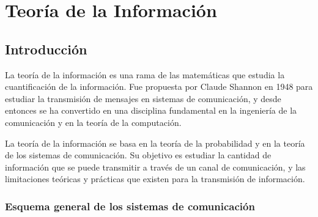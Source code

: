 \section{Teoría de la Información}\label{teoruxeda-de-la-informaciuxf3n}





\subsection{Introducción}\label{introducciuxf3n}

La teoría de la información es una rama de las matemáticas que estudia
la cuantificación de la información. Fue propuesta por Claude Shannon en
1948 para estudiar la transmisión de mensajes en sistemas de
comunicación, y desde entonces se ha convertido en una disciplina
fundamental en la ingeniería de la comunicación y en la teoría de la
computación.

La teoría de la información se basa en la teoría de la probabilidad y en
la teoría de los sistemas de comunicación. Su objetivo es estudiar la
cantidad de información que se puede transmitir a través de un canal de
comunicación, y las limitaciones teóricas y prácticas que existen para
la transmisión de información.

\subsubsection{Esquema general de los sistemas de
comunicación}\label{esquema-general-de-los-sistemas-de-comunicaciuxf3n}

\begin{figure}[htbp!]
\centering

\end{figure}

